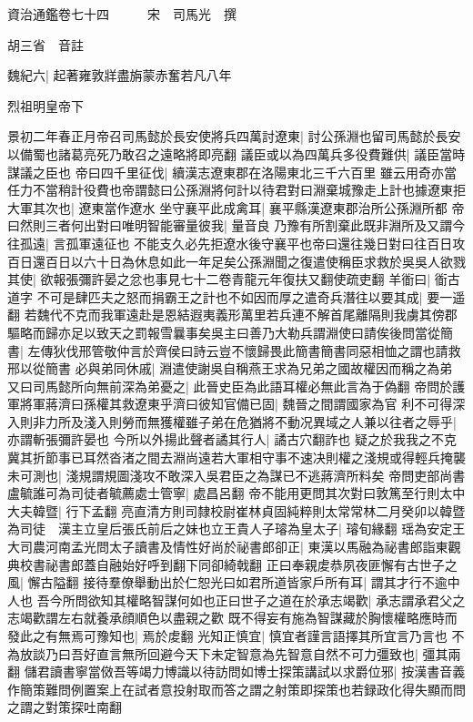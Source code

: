 資治通鑑卷七十四　　　宋　司馬光　撰

胡三省　音註

魏紀六|{
	起著雍敦牂盡旃蒙赤奮若凡八年}


烈祖明皇帝下

景初二年春正月帝召司馬懿於長安使將兵四萬討遼東|{
	討公孫淵也留司馬懿於長安以備蜀也諸葛亮死乃敢召之遠略將即亮翻}
議臣或以為四萬兵多役費難供|{
	議臣當時謀議之臣也}
帝曰四千里征伐|{
	續漢志遼東郡在洛陽東北三千六百里}
雖云用奇亦當任力不當稍計役費也帝謂懿曰公孫淵將何計以待君對曰淵棄城豫走上計也據遼東拒大軍其次也|{
	遼東當作遼水}
坐守襄平此成禽耳|{
	襄平縣漢遼東郡治所公孫淵所都}
帝曰然則三者何出對曰唯明智能審量彼我|{
	量音良}
乃豫有所割棄此既非淵所及又謂今往孤遠|{
	言孤軍遠征也}
不能支久必先拒遼水後守襄平也帝曰還往幾日對曰往百日攻百日還百日以六十日為休息如此一年足矣公孫淵聞之復遣使稱臣求救於吳吳人欲戮其使|{
	欲報張彌許晏之忿也事見七十二卷青龍元年復扶又翻使疏吏翻}
羊衜曰|{
	衜古道字}
不可是肆匹夫之怒而捐霸王之計也不如因而厚之遣奇兵潛往以要其成|{
	要一遥翻}
若魏代不克而我軍遠赴是恩結遐夷義形萬里若兵連不解首尾離隔則我虜其傍郡驅略而歸亦足以致天之罰報雪曩事矣吳主曰善乃大勒兵謂淵使曰請俟後問當從簡書|{
	左傳狄伐邢管敬仲言於齊侯曰詩云豈不懷歸畏此簡書簡書同惡相恤之謂也請救邢以從簡書}
必與弟同休戚|{
	淵遣使謝吳自稱燕王求為兄弟之國故權因而稱之為弟}
又曰司馬懿所向無前深為弟憂之|{
	此晉史臣為此語耳權必無此言為于偽翻}
帝問於護軍將軍蔣濟曰孫權其救遼東乎濟曰彼知官備已固|{
	魏晉之間謂國家為官}
利不可得深入則非力所及淺入則勞而無獲權雖子弟在危猶將不動况異域之人兼以往者之辱乎|{
	亦謂斬張彌許晏也}
今所以外揚此聲者譎其行人|{
	譎古穴翻詐也}
疑之於我我之不克冀其折節事已耳然沓渚之間去淵尚遠若大軍相守事不速决則權之淺規或得輕兵掩襲未可測也|{
	淺規謂規圖淺攻不敢深入吳君臣之為謀已不逃蔣濟所料矣}
帝問吏部尚書盧毓誰可為司徒者毓薦處士管寧|{
	處昌呂翻}
帝不能用更問其次對曰敦篤至行則太中大夫韓暨|{
	行下孟翻}
亮直清方則司隸校尉崔林貞固純粹則太常常林二月癸卯以韓暨為司徒　漢主立皇后張氏前后之妹也立王貴人子璿為皇太子|{
	璿旬緣翻}
瑶為安定王大司農河南孟光問太子讀書及情性好尚於祕書郎卻正|{
	東漢以馬融為祕書郎詣東觀典校書祕書郎蓋自融始好呼到翻下同卻綺戟翻}
正曰奉親䖍恭夙夜匪懈有古世子之風|{
	懈古隘翻}
接待羣僚舉動出於仁恕光曰如君所道皆家戶所有耳|{
	謂其才行不逾中人也}
吾今所問欲知其權略智謀何如也正曰世子之道在於承志竭歡|{
	承志謂承君父之志竭歡謂左右就養承顔順色以盡親之歡}
既不得妄有施為智謀藏於胸懷權略應時而發此之有無焉可豫知也|{
	焉於䖍翻}
光知正慎宜|{
	慎宜者謹言語擇其所宜言乃言也}
不為放談乃曰吾好直言無所回避今天下未定智意為先智意自然不可力彊致也|{
	彊其兩翻}
儲君讀書寧當傚吾等竭力博識以待訪問如博士探策講試以求爵位邪|{
	按漢書音義作簡策難問例置案上在試者意投射取而答之謂之射策即探策也若録政化得失顯而問之謂之對策探吐南翻}
